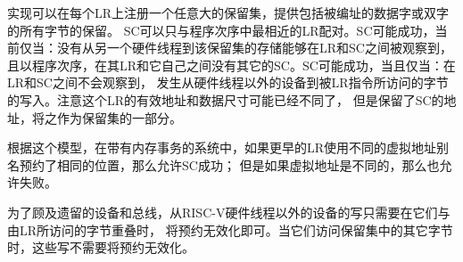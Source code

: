实现可以在每个LR上注册一个任意大的保留集，提供包括被编址的数据字或双字的所有字节的保留。
SC可以只与程序次序中最相近的LR配对。SC可能成功，当前仅当：没有从另一个硬件线程到该保留集的存储能够在LR和SC之间被观察到，
且以程序次序，在其LR和它自己之间没有其它的SC。SC可能成功，当且仅当：在LR和SC之间不会观察到，
发生从硬件线程以外的设备到被LR指令所访问的字节的写入。注意这个LR的有效地址和数据尺寸可能已经不同了，
但是保留了SC的地址，将之作为保留集的一部分。
\begin{commentary}
  根据这个模型，在带有内存事务的系统中，如果更早的LR使用不同的虚拟地址别名预约了相同的位置，那么允许SC成功；
  但是如果虚拟地址是不同的，那么也允许失败。
\end{commentary}
\begin{commentary}
  为了顾及遗留的设备和总线，从RISC-V硬件线程以外的设备的写只需要在它们与由LR所访问的字节重叠时，
  将预约无效化即可。当它们访问保留集中的其它字节时，这些写不需要将预约无效化。
\end{commentary}


